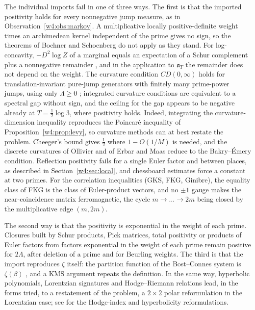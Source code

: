 \documentclass[11pt]{amsart}
\theoremstyle{definition}
\theoremstyle{remark}
\numberwithin{equation}{section}
\newcommand{\aT}{\mathfrak{a}_T}                       %
\begin{document}
\label{w4:tab:import}%
The individual imports fail in one of three ways. The first is that the imported positivity holds for every nonnegative
jump measure, as in Observation~\ref{w4:obs:markov}. A multiplicative locally positive-definite weight times an
archimedean kernel independent of the prime gives no sign, so the theorems of Bochner and Schoenberg do not apply as
they stand. For log-concavity, $-D^2\log Z$ of a marginal equals an expectation of a Schur complement plus a
nonnegative remainder \cite{BrascampLieb1976}, and in the application to $\aT$ the remainder does not depend on the
weight. The curvature condition $CD(0,\infty)$ holds for translation-invariant pure-jump generators with finitely many
prime-power jumps, using only $\Lambda\ge0$ \cite[Theorems~5.2--5.3]{P35}; integrated curvature conditions are
equivalent to a spectral gap without sign, and the ceiling for the gap appears to be negative already at
$T=\frac12\log3$, where positivity holds. Indeed, integrating the curvature-dimension inequality reproduces the
Poincar\'e inequality of Proposition~\ref{w4:prop:levy}, so curvature methods can at best restate the problem. Cheeger's
bound gives $\frac12$ where $1-O(1/M)$ is needed, and the discrete curvatures of Ollivier and of Erbar and Maas reduce
to the Bakry--\'Emery condition. Reflection positivity fails for a single Euler factor and between places, as described
in Section~\ref{w4:sec:local}, and chessboard estimates force a constant at two primes. For the correlation inequalities
(GKS, FKG, Ginibre), the equality class of FKG is the class of Euler-product vectors, and no $\pm1$ gauge makes the
near-coincidence matrix ferromagnetic, the cycle $m\to\dots\to2m$ being closed by the multiplicative edge $(m,2m)$.

The second way is that the positivity is exponential in the weight of each prime. Closures built by Schur products,
Pick matrices, total positivity or products of Euler factors from factors exponential in the weight of each prime
remain positive for $2\Lambda$, after deletion of a prime and for Beurling weights. The third is that the import
reproduces $\zeta$ itself: the partition function of the Bost--Connes system is $\zeta(\beta)$ \cite{BostConnes1995},
and a KMS argument repeats the definition. In the same way, hyperbolic polynomials, Lorentzian signatures and
Hodge--Riemann relations lead, in the forms tried, to a restatement of the problem, a $2\times2$ polar reformulation in
the Lorentzian case; see \cite{P14} for the Hodge-index and hyperbolicity reformulations.
\end{document}
